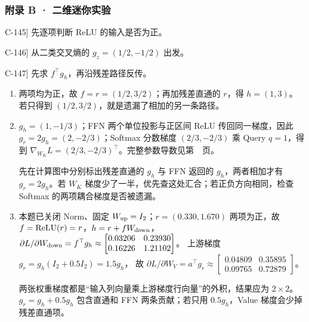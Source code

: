 \subsubsection*{附录 B · 二维迷你实验}
\begin{answerhints}
\item[\hyperref[exercise:rational-mini-residual-warmup]{C-145}] \leavevmode{}\label{hint:rational-mini-residual-warmup}先逐项判断 ReLU 的输入是否为正。
\item[\hyperref[exercise:rational-mini-gradient]{C-146}] \leavevmode{}\label{hint:rational-mini-gradient}从二类交叉熵的 $g_z=(1/2,-1/2)$ 出发。
\item[\hyperref[exercise:simplified-block-gradient]{C-147}] \leavevmode{}\label{hint:simplified-block-gradient}先求 $f^\top g_h$，再沿残差路径反传。
\end{answerhints}
\begin{enumerate}[label={},leftmargin=4.8em,itemsep=4pt]
\item[\textbf{\hyperref[exercise:rational-mini-residual-warmup]{C-145.}}] \leavevmode{}\label{solution:C-145}\label{solution:rational-mini-residual-warmup}两项均为正，故 $f=r=(1/2,3/2)$；再加残差直通的 $r$，得 $h=(1,3)$。若只得到 $(1/2,3/2)$，就是遗漏了相加的另一条路径。
\item[\textbf{\hyperref[exercise:rational-mini-gradient]{C-146.}}] \leavevmode{}\label{solution:C-146}\label{solution:rational-mini-gradient}$g_h=(1,-1/3)$；FFN 两个单位投影与正区间 ReLU 传回同一梯度，因此 $g_r=2g_h=(2,-2/3)$；Softmax 分数梯度 $(2/3,-2/3)$ 乘 Query $q=1$，得到 $\nabla_{W_K}L=(2/3,-2/3)^\top$。完整参数导数见第~\pageref*{app:rational-mini}~页。\par 先在计算图中分别标出残差直通的 $g_h$ 与 FFN 返回的 $g_h$，两者相加才有 $g_r=2g_h$。若 $W_K$ 梯度少了一半，优先查这处汇合；若正负方向相同，检查 Softmax 的两项耦合梯度是否被遗漏。
\item[\textbf{\hyperref[exercise:simplified-block-gradient]{C-147.}}] \leavevmode{}\label{solution:C-147}\label{solution:simplified-block-gradient}本题已关闭 Norm、固定 $W_{\rm up}=I_2$；$r=(0.330,1.670)$ 两项为正，故 $f=\operatorname{ReLU}(r)=r$，$h=r+fW_{\rm down}$，
$\partial L/\partial W_{\rm down}=f^\top g_h
\approx\begin{bmatrix}0.03206&0.23930\\0.16226&1.21102\end{bmatrix}$。
上游梯度 $g_r=g_h(I_2+0.5I_2)=1.5g_h$，
故 $\partial L/\partial W_V=a^\top g_r
\approx\begin{bmatrix}0.04809&0.35895\\0.09765&0.72879\end{bmatrix}$。\par 两张权重梯度都是“输入列向量乘上游梯度行向量”的外积，结果应为 $2\times2$。$g_r=g_h+0.5g_h$ 包含直通和 FFN 两条贡献；若只用 $0.5g_h$，Value 梯度会少掉残差直通项。
\end{enumerate}
